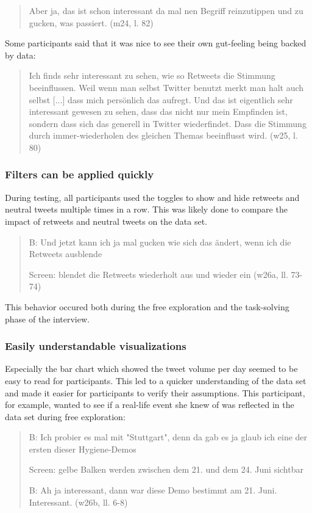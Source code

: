 \begin{quote}
    Aber ja, das ist schon interessant da mal nen Begriff reinzutippen und zu gucken, was passiert. (m24, l. 82)
\end{quote}

Some participants said that it was nice to see their own gut-feeling being backed by data:

\begin{quote}
    Ich finds sehr interessant zu sehen, wie so Retweets die Stimmung beeinflussen. Weil wenn man selbst Twitter benutzt merkt man halt auch selbst [...] dass mich persönlich das aufregt. Und das ist eigentlich sehr interessant gewesen zu sehen, dass das nicht nur mein Empfinden ist, sondern dass sich das generell in Twitter wiederfindet. Dass die Stimmung durch immer-wiederholen des gleichen Themas beeinflusst wird. (w25, l. 80)
\end{quote}

\subsubsection*{Filters can be applied quickly}
During testing, all participants used the toggles to show and hide retweets and neutral tweets multiple times in a row. This was likely done to compare the impact of retweets and neutral tweets on the data set.

\begin{quote}
    B: Und jetzt kann ich ja mal gucken wie sich das ändert, wenn ich die Retweets ausblende

    Screen: blendet die Retweets wiederholt aus und wieder ein (w26a, ll. 73-74)
\end{quote}

This behavior occured both during the free exploration and the task-solving phase of the interview.

\subsubsection*{Easily understandable visualizations}
Especially the bar chart which showed the tweet volume per day seemed to be easy to read for participants. This led to a quicker understanding of the data set and made it easier for participants to verify their assumptions. This participant, for example, wanted to see if a real-life event she knew of was reflected in the data set during free exploration:

\begin{quote}
    B: Ich probier es mal mit "Stuttgart", denn da gab es ja glaub ich eine der ersten dieser Hygiene-Demos
    
    Screen: gelbe Balken werden zwischen dem 21. und dem 24. Juni sichtbar
    
    B: Ah ja interessant, dann war diese Demo bestimmt am 21. Juni. Interessant. (w26b, ll. 6-8)
\end{quote}

